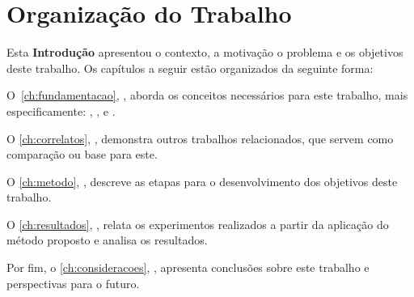 

\section{Organização do Trabalho}\label{sec:organizacao}
Esta \textbf{Introdução} apresentou o contexto, a motivação o problema e os objetivos deste trabalho. Os capítulos a seguir estão organizados da seguinte forma:

O~\autoref{ch:fundamentacao}, \textbf{}, aborda os conceitos necessários para este trabalho, mais especificamente: , ,  e .

O \autoref{ch:correlatos}, \textbf{}, demonstra outros trabalhos relacionados, que servem como comparação ou base para este.

O \autoref{ch:metodo}, \textbf{}, descreve as etapas para o desenvolvimento dos objetivos deste trabalho.

O \autoref{ch:resultados}, \textbf{}, relata os experimentos realizados a partir da aplicação do método proposto e analisa os resultados.

Por fim, o \autoref{ch:consideracoes}, \textbf{}, apresenta conclusões sobre este trabalho e perspectivas para o futuro.